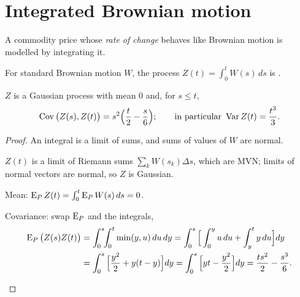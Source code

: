 \section{Integrated Brownian motion}

A commodity price whose \emph{rate of change} behaves like Brownian motion is modelled by integrating it.

\begin{definition}
For standard Brownian motion $W$, the process $Z(t)=\int_0^tW(s)\,ds$ is .
\end{definition}

\begin{result}
\label{res:ibm}
$Z$ is a Gaussian process with mean $0$ and, for $s\le t$,
\[
  \operatorname{Cov}\big(Z(s),Z(t)\big)=s^2\Big(\frac t2-\frac s6\Big);\qquad\text{in particular }\operatorname{Var} Z(t)=\frac{t^3}{3}.
\]
\end{result}
\begin{proof}
An integral is a limit of sums, and sums of values of $W$ are normal.
\begin{steps}
  \item $Z(t)$ is a limit of Riemann sums $\sum_kW(s_k)\Delta s$, which are MVN; limits of normal vectors are normal, so $Z$ is Gaussian.
  \item Mean: $\operatorname{E}_PZ(t)=\int_0^t\operatorname{E}_PW(s)\,ds=0$.
  \item Covariance: swap $\operatorname{E}_P$ and the integrals,
  \[
    \begin{aligned}
    \operatorname{E}_P\big(Z(s)Z(t)\big)&=\int_0^s\!\!\int_0^t\min(y,u)\,du\,dy=\int_0^s\Big[\int_0^yu\,du+\int_y^ty\,du\Big]dy\\
    &=\int_0^s\Big[\frac{y^2}{2}+y(t-y)\Big]dy=\int_0^s\Big[yt-\frac{y^2}{2}\Big]dy=\frac{ts^2}{2}-\frac{s^3}{6}. \qedhere
    \end{aligned}
  \]
\end{steps}
\end{proof}

\begin{pic}
\end{pic}


